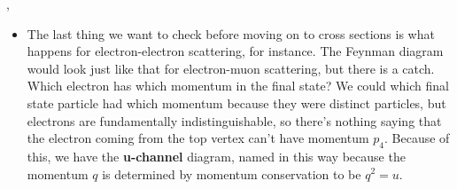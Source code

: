\sep


\begin{itemize}
    \item The last thing we want to check before moving on to cross sections is what happens for electron-electron scattering, for instance. The Feynman diagram would look just like that for electron-muon scattering, but there is a catch. Which electron has which momentum in the final state? We could which final state particle had which momentum because they were distinct particles, but electrons are fundamentally indistinguishable, so there's nothing saying that the electron coming from the top vertex can't have momentum $p_4$. Because of this, we have the \textbf{u-channel} diagram, named in this way because the momentum $q$ is determined by momentum conservation to be $q^2=u$.
    \begin{center}
\end{center}
\end{itemize}
